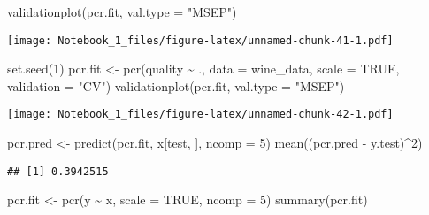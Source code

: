 \documentclass[
]{article}
\newenvironment{Shaded}{\begin{snugshade}}{\end{snugshade}}
\newcommand{\AttributeTok}[1]{\textcolor[rgb]{0.77,0.63,0.00}{#1}}
\newcommand{\ConstantTok}[1]{\textcolor[rgb]{0.00,0.00,0.00}{#1}}
\newcommand{\DecValTok}[1]{\textcolor[rgb]{0.00,0.00,0.81}{#1}}
\newcommand{\FunctionTok}[1]{\textcolor[rgb]{0.00,0.00,0.00}{#1}}
\newcommand{\NormalTok}[1]{#1}
\newcommand{\OtherTok}[1]{\textcolor[rgb]{0.56,0.35,0.01}{#1}}
\newcommand{\SpecialCharTok}[1]{\textcolor[rgb]{0.00,0.00,0.00}{#1}}
\newcommand{\StringTok}[1]{\textcolor[rgb]{0.31,0.60,0.02}{#1}}
\begin{document}
\begin{Shaded}
\begin{Highlighting}[]
\FunctionTok{validationplot}\NormalTok{(pcr.fit, }\AttributeTok{val.type =} \StringTok{"MSEP"}\NormalTok{)}
\end{Highlighting}
\end{Shaded}

\texttt{[image: Notebook\_1\_files/figure-latex/unnamed-chunk-41-1.pdf]}

\begin{Shaded}
\begin{Highlighting}[]
\FunctionTok{set.seed}\NormalTok{(}\DecValTok{1}\NormalTok{)}
\NormalTok{pcr.fit }\OtherTok{\textless{}{-}} \FunctionTok{pcr}\NormalTok{(quality }\SpecialCharTok{\textasciitilde{}}\NormalTok{ ., }\AttributeTok{data =}\NormalTok{ wine\_data, }\AttributeTok{scale =} \ConstantTok{TRUE}\NormalTok{, }\AttributeTok{validation =} \StringTok{"CV"}\NormalTok{)}
\FunctionTok{validationplot}\NormalTok{(pcr.fit, }\AttributeTok{val.type =} \StringTok{"MSEP"}\NormalTok{)}
\end{Highlighting}
\end{Shaded}

\texttt{[image: Notebook\_1\_files/figure-latex/unnamed-chunk-42-1.pdf]}

\begin{Shaded}
\begin{Highlighting}[]
\NormalTok{pcr.pred }\OtherTok{\textless{}{-}} \FunctionTok{predict}\NormalTok{(pcr.fit, x[test, ], }\AttributeTok{ncomp =} \DecValTok{5}\NormalTok{)}
\FunctionTok{mean}\NormalTok{((pcr.pred }\SpecialCharTok{{-}}\NormalTok{ y.test)}\SpecialCharTok{\^{}}\DecValTok{2}\NormalTok{)}
\end{Highlighting}
\end{Shaded}

\begin{verbatim}
## [1] 0.3942515
\end{verbatim}

\begin{Shaded}
\begin{Highlighting}[]
\NormalTok{pcr.fit }\OtherTok{\textless{}{-}} \FunctionTok{pcr}\NormalTok{(y }\SpecialCharTok{\textasciitilde{}}\NormalTok{ x, }\AttributeTok{scale =} \ConstantTok{TRUE}\NormalTok{, }\AttributeTok{ncomp =} \DecValTok{5}\NormalTok{)}
\FunctionTok{summary}\NormalTok{(pcr.fit)}
\end{Highlighting}
\end{Shaded}
\end{document}
